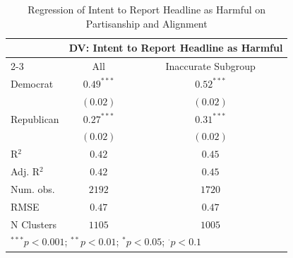 
\begin{table}[!htpb]
\caption{Regression of Intent to Report Headline as Harmful on Partisanship and Alignment}
\begin{center}
\begin{tabular}{l c c}
\hline
 & \multicolumn{2}{c}{DV: Intent to Report Headline as Harmful} \\
\cline{2-3}
 & All & Inaccurate Subgroup \\
\hline
Democrat   & $0.49^{***}$ & $0.52^{***}$ \\
           & $(0.02)$     & $(0.02)$     \\
Republican & $0.27^{***}$ & $0.31^{***}$ \\
           & $(0.02)$     & $(0.02)$     \\
\hline
R$^2$      & $0.42$       & $0.45$       \\
Adj. R$^2$ & $0.42$       & $0.45$       \\
Num. obs.  & $2192$       & $1720$       \\
RMSE       & $0.47$       & $0.47$       \\
N Clusters & $1105$       & $1005$       \\
\hline
\multicolumn{3}{l}{\scriptsize{$^{***}p<0.001$; $^{**}p<0.01$; $^{*}p<0.05$; $^{\cdot}p<0.1$}}
\end{tabular}
\label{tab:withoutinteraction-mainspecification-harm-weighted-clusteredses-ld}
\end{center}
\end{table}
